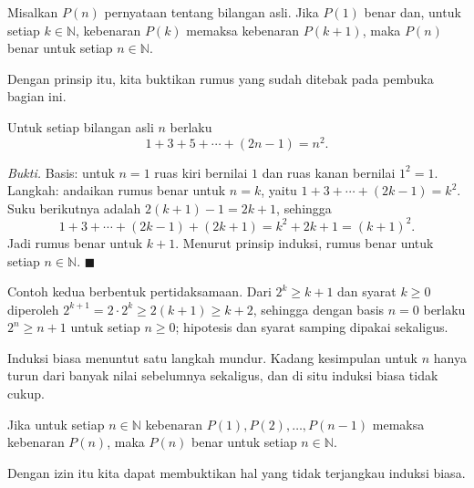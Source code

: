 \begin{catatan}
Misalkan $P(n)$ pernyataan tentang bilangan asli. Jika $P(1)$ benar dan, untuk setiap
$k \in \mathbb{N}$, kebenaran $P(k)$ memaksa kebenaran $P(k+1)$, maka $P(n)$ benar
untuk setiap $n \in \mathbb{N}$.
\end{catatan}

Dengan prinsip itu, kita buktikan rumus yang sudah ditebak pada pembuka bagian ini.

\begin{teorema}
Untuk setiap bilangan asli $n$ berlaku
\[
  1 + 3 + 5 + \cdots + (2n-1) = n^{2}.
\]
\end{teorema}
\par\smallskip\noindent\textit{Bukti.} Basis: untuk $n = 1$ ruas kiri bernilai $1$ dan
ruas kanan bernilai $1^{2} = 1$. Langkah: andaikan rumus benar untuk $n = k$, yaitu
$1+3+\cdots+(2k-1) = k^{2}$. Suku berikutnya adalah $2(k+1)-1 = 2k+1$, sehingga
\[
  1+3+\cdots+(2k-1)+(2k+1) = k^{2} + 2k + 1 = (k+1)^{2}.
\]
Jadi rumus benar untuk $k+1$. Menurut prinsip induksi, rumus benar untuk setiap
$n \in \mathbb{N}$.
\hfill$\blacksquare${\parfillskip=0pt\par}

Contoh kedua berbentuk pertidaksamaan. Dari $2^{k} \geq k+1$ dan syarat $k \geq 0$
diperoleh $2^{k+1} = 2 \cdot 2^{k} \geq 2(k+1) \geq k+2$, sehingga dengan basis $n = 0$
berlaku $2^{n} \geq n+1$ untuk setiap $n \geq 0$; hipotesis dan syarat samping dipakai
sekaligus.

Induksi biasa menuntut satu langkah mundur. Kadang kesimpulan untuk $n$ hanya turun dari
banyak nilai sebelumnya sekaligus, dan di situ induksi biasa tidak cukup.

\begin{catatan}
Jika untuk setiap $n \in \mathbb{N}$ kebenaran $P(1), P(2), \dots, P(n-1)$ memaksa
kebenaran $P(n)$, maka $P(n)$ benar untuk setiap $n \in \mathbb{N}$.
\end{catatan}


Dengan izin itu kita dapat membuktikan hal yang tidak terjangkau induksi biasa.


